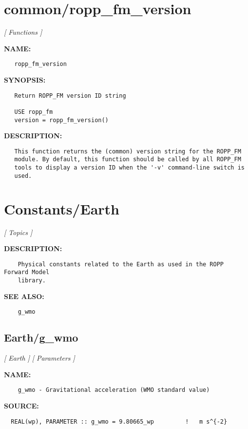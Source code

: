 \section{common/ropp\_fm\_version}
\textsl{[ Functions ]}

\label{ch:robo16}
\label{ch:common_ropp_fm_version}
\textbf{NAME:}\hspace{0.08in}\begin{Verbatim}
   ropp_fm_version
\end{Verbatim}
\textbf{SYNOPSIS:}\hspace{0.08in}\begin{Verbatim}
   Return ROPP_FM version ID string

   USE ropp_fm
   version = ropp_fm_version()
\end{Verbatim}
\textbf{DESCRIPTION:}\hspace{0.08in}\begin{Verbatim}
   This function returns the (common) version string for the ROPP_FM
   module. By default, this function should be called by all ROPP_FM
   tools to display a version ID when the '-v' command-line switch is
   used.
\end{Verbatim}
\section{Constants/Earth}
\textsl{[ Topics ]}

\label{ch:robo23}
\label{ch:Constants_Earth}
\textbf{DESCRIPTION:}\hspace{0.08in}\begin{Verbatim}
    Physical constants related to the Earth as used in the ROPP Forward Model
    library. 
\end{Verbatim}
\textbf{SEE ALSO:}\hspace{0.08in}\begin{Verbatim}
    g_wmo
\end{Verbatim}
\subsection{Earth/g\_wmo}
\textsl{[ Earth ]}
\textsl{[ Parameters ]}

\label{ch:robo40}
\label{ch:Earth_g_wmo}
\textbf{NAME:}\hspace{0.08in}\begin{Verbatim}
    g_wmo - Gravitational acceleration (WMO standard value)
\end{Verbatim}
\textbf{SOURCE:}\hspace{0.08in}\begin{Verbatim}
  REAL(wp), PARAMETER :: g_wmo = 9.80665_wp         !   m s^{-2}
\end{Verbatim}
